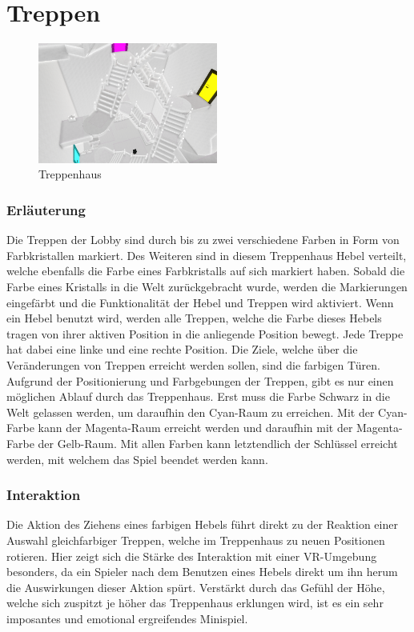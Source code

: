 \section{Treppen}
\begin{figure}
	\vspace*{-0.5cm}
	\includegraphics[width=5.9cm]{Pictures/Treppenhaus}
	\caption{Treppenhaus}
	\vspace*{-1cm}
	\label{fig:treppenhaus}
\end{figure}
\subsubsection{Erläuterung}
Die Treppen der Lobby sind durch bis zu zwei verschiedene Farben in Form von Farbkristallen markiert. Des Weiteren sind in diesem Treppenhaus Hebel verteilt, welche ebenfalls die Farbe eines Farbkristalls auf sich markiert haben. Sobald die Farbe eines Kristalls in die Welt zurückgebracht wurde, werden die Markierungen eingefärbt und die Funktionalität der Hebel und Treppen wird aktiviert. Wenn ein Hebel benutzt wird, werden alle Treppen, welche die Farbe dieses Hebels tragen von ihrer aktiven Position in die anliegende Position bewegt. Jede Treppe hat dabei eine linke und eine rechte Position. Die Ziele, welche über die Veränderungen von Treppen erreicht werden sollen, sind die farbigen Türen. Aufgrund der Positionierung und Farbgebungen der Treppen, gibt es nur einen möglichen Ablauf durch das Treppenhaus. Erst muss die Farbe Schwarz in die Welt gelassen werden, um daraufhin den Cyan-Raum zu erreichen. Mit der Cyan-Farbe kann der Magenta-Raum erreicht werden und daraufhin mit der Magenta-Farbe der Gelb-Raum. Mit allen Farben kann letztendlich der Schlüssel erreicht werden, mit welchem das Spiel beendet werden kann.


\subsubsection{Interaktion}
\noindent Die Aktion des Ziehens eines farbigen Hebels führt direkt zu der Reaktion einer Auswahl gleichfarbiger Treppen, welche im Treppenhaus zu neuen Positionen rotieren. Hier zeigt sich die Stärke des Interaktion mit einer VR-Umgebung besonders, da ein Spieler nach dem Benutzen eines Hebels direkt um ihn herum die Auswirkungen dieser Aktion spürt. Verstärkt durch das Gefühl der Höhe, welche sich zuspitzt je höher das Treppenhaus erklungen wird, ist es ein sehr imposantes und emotional ergreifendes Minispiel.

